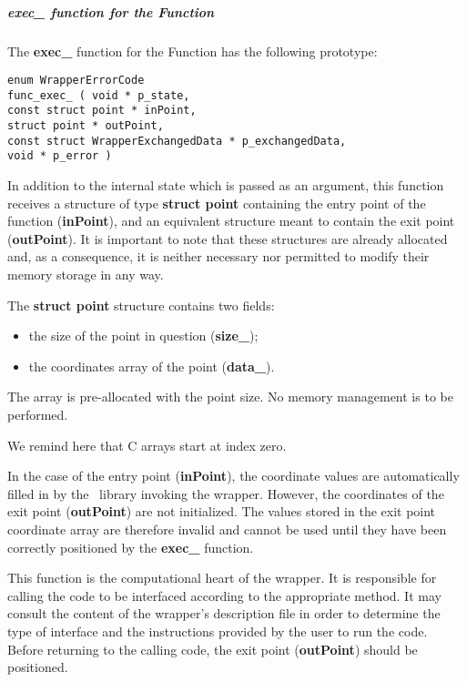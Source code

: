 \subparagraph{exec\_ function for the Function}

The {\bf exec\_} function for the Function has the following prototype:

\lstset{language=C++, basicstyle=\normalsize}
\begin{lstlisting}[frame=TBRL]
enum WrapperErrorCode
func_exec_ ( void * p_state,
const struct point * inPoint,
struct point * outPoint,
const struct WrapperExchangedData * p_exchangedData,
void * p_error )
\end{lstlisting}

In addition to the internal state which is passed as an argument, this function receives a structure of type {\bf struct point} containing the entry point of the function ({\bf inPoint}), and an equivalent structure meant to contain the exit point ({\bf outPoint}). It is important to note that these structures are already allocated and, as a consequence, it is neither necessary nor permitted to modify their memory storage in any way.

The {\bf struct point} structure contains two fields:
\begin{itemize}
\item the size of the point in question ({\bf size\_});
\item the coordinates array of the point ({\bf data\_}).
\end{itemize}

The array is pre-allocated with the point size. No memory management is to be performed.

We remind here that C arrays start at index zero.

In the case of the entry point ({\bf inPoint}), the coordinate values are automatically filled in by the \OT\ library invoking the wrapper. However, the coordinates of the exit point ({\bf outPoint}) are not initialized. The values stored in the exit point coordinate array are therefore invalid and cannot be used until they have been correctly positioned by the {\bf exec\_} function.

This function is the computational heart of the wrapper. It is responsible for calling the code to be interfaced according to the appropriate method. It may consult the content of the wrapper's description file in order to determine the type of interface and the instructions provided by the user to run the code. Before returning to the calling code, the exit point ({\bf outPoint}) should be positioned.

